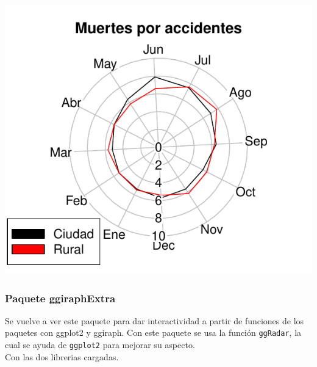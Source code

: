 \documentclass{article}\usepackage[]{graphicx}\usepackage[]{color}
\makeatletter
\def\maxwidth{ %
  \ifdim\Gin@nat@width>\linewidth
    \linewidth
  \else
    \Gin@nat@width
  \fi
}
\newenvironment{knitrout}{}{} %
\makeatother
\begin{document}
\begin{knitrout}
\color{fgcolor}

{\centering \includegraphics[width=\maxwidth]{figure/plot_plotrix_2-1} 

}



\end{knitrout}
\subsubsection{Paquete ggiraphExtra}
Se vuelve a ver este paquete \cite{docu_ggiraphExtra}
para dar interactividad a partir de funciones de los paquetes con ggplot2 y ggiraph.
Con este paquete se usa la funci\'on \texttt{ggRadar}, la cual se ayuda de \texttt{ggplot2} para mejorar su aspecto.~\\
Con las dos librerias cargadas.
\end{document}
